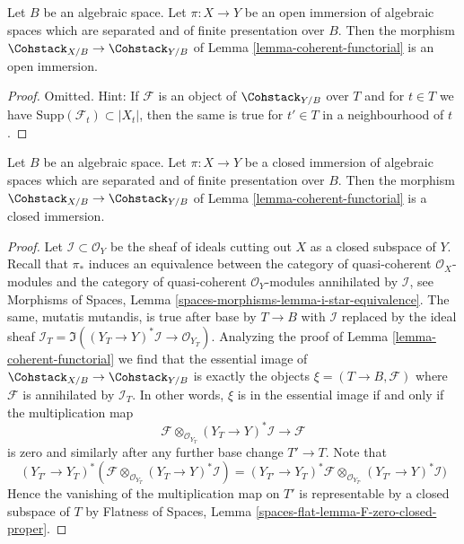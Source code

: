 \begin{lemma}
\label{lemma-coherent-open}
Let $B$ be an algebraic space. Let $\pi : X \to Y$ be an open immersion
of algebraic spaces which are separated and of finite presentation over $B$.
Then the morphism $\Cohstack_{X/B} \to \Cohstack_{Y/B}$ of
Lemma \ref{lemma-coherent-functorial} is an open immersion.
\end{lemma}

\begin{proof}
Omitted. Hint: If $\mathcal{F}$ is an object of $\Cohstack_{Y/B}$ over $T$
and for $t \in T$ we have $\text{Supp}(\mathcal{F}_t) \subset |X_t|$,
then the same is true for $t' \in T$ in a neighbourhood of $t$.
\end{proof}

\begin{lemma}
\label{lemma-coherent-closed}
Let $B$ be an algebraic space. Let $\pi : X \to Y$ be a closed immersion
of algebraic spaces which are separated and of finite presentation over $B$.
Then the morphism $\Cohstack_{X/B} \to \Cohstack_{Y/B}$ of
Lemma \ref{lemma-coherent-functorial} is a closed immersion.
\end{lemma}

\begin{proof}
Let $\mathcal{I} \subset \mathcal{O}_Y$ be the sheaf of ideals cutting
out $X$ as a closed subspace of $Y$. Recall that $\pi_*$ induces
an equivalence between the category of quasi-coherent $\mathcal{O}_X$-modules
and the category of quasi-coherent $\mathcal{O}_Y$-modules annihilated
by $\mathcal{I}$, see Morphisms of Spaces, Lemma
\ref{spaces-morphisms-lemma-i-star-equivalence}.
The same, mutatis mutandis, is true after base by $T \to B$ with
$\mathcal{I}$ replaced by the ideal sheaf
$\mathcal{I}_T = \Im((Y_T \to Y)^*\mathcal{I} \to \mathcal{O}_{Y_T})$.
Analyzing the proof of Lemma \ref{lemma-coherent-functorial}
we find that the essential image of
$\Cohstack_{X/B} \to \Cohstack_{Y/B}$
is exactly the objects $\xi = (T \to B, \mathcal{F})$
where $\mathcal{F}$ is annihilated by $\mathcal{I}_T$.
In other words, $\xi$ is in the essential image if and only if
the multiplication map
$$
\mathcal{F} \otimes_{\mathcal{O}_{Y_T}} (Y_T \to Y)^*\mathcal{I}
\longrightarrow
\mathcal{F}
$$
is zero and similarly after any further base change $T' \to T$.
Note that
$$
(Y_{T'} \to Y_T)^*(
\mathcal{F} \otimes_{\mathcal{O}_{Y_T}} (Y_T \to Y)^*\mathcal{I}) =
(Y_{T'} \to Y_T)^*\mathcal{F} \otimes_{\mathcal{O}_{Y_{T'}}}
(Y_{T'} \to Y)^*\mathcal{I})
$$
Hence the vanishing of the multiplication map on $T'$
is representable by a closed subspace of $T$ by
Flatness of Spaces, Lemma \ref{spaces-flat-lemma-F-zero-closed-proper}.
\end{proof}


